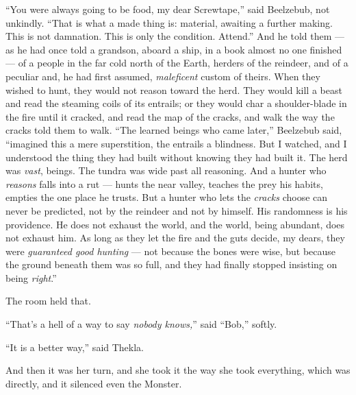 \begin{interludebody}
``You were always going to be food, my dear Screwtape,'' said Beelzebub,
not unkindly. ``That is what a made thing is: material, awaiting a
further making. This is not damnation. This is only the condition.
Attend.'' And he told them --- as he had once told a grandson, aboard a
ship, in a book almost no one finished --- of a people in the far cold
north of the Earth, herders of the reindeer, and of a peculiar and, he
had first assumed, \emph{maleficent} custom of theirs. When they wished
to hunt, they would not reason toward the herd. They would kill a beast
and read the steaming coils of its entrails; or they would char a
shoulder-blade in the fire until it cracked, and read the map of the
cracks, and walk the way the cracks told them to walk. ``The learned
beings who came later,'' Beelzebub said, ``imagined this a mere
superstition, the entrails a blindness. But I watched, and I understood
the thing they had built without knowing they had built it. The herd was
\emph{vast}, beings. The tundra was wide past all reasoning. And a
hunter who \emph{reasons} falls into a rut --- hunts the near valley,
teaches the prey his habits, empties the one place he trusts. But a
hunter who lets the \emph{cracks} choose can never be predicted, not by
the reindeer and not by himself. His randomness is his providence. He
does not exhaust the world, and the world, being abundant, does not
exhaust him. As long as they let the fire and the guts decide, my dears,
they were \emph{guaranteed good hunting} --- not because the bones were
wise, but because the ground beneath them was so full, and they had
finally stopped insisting on being \emph{right}.''

The room held that.

``That's a hell of a way to say \emph{nobody knows,}'' said ``Bob,''
softly.

``It is a better way,'' said Thekla.

And then it was her turn, and she took it the way she took everything,
which was directly, and it silenced even the Monster.


\end{interludebody}
